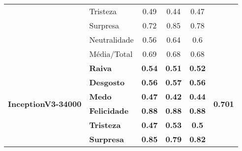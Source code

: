 \begin{table}[]
\begin{tabular}{llcccc}
                                            & Tristeza              & 0.49                                  & 0.44                                   & 0.47                                  &                                       \\
                                            & Surpresa              & 0.72                                  & 0.85                                   & 0.78                                  &                                       \\
                                            & Neutralidade          & 0.56                                  & 0.64                                   & 0.6                                   &                                       \\
                                            & Média/Total           & 0.69                                  & 0.68                                   & 0.68                                  &                                       \\ \hline
\multirow{8}{*}{\textbf{InceptionV3-34000}} & \textbf{Raiva}        & \textbf{0.54}                         & \textbf{0.51}                          & \textbf{0.52}                         & \multirow{8}{*}{\textbf{0.701}}       \\
                                            & \textbf{Desgosto}     & \textbf{0.56}                         & \textbf{0.57}                          & \textbf{0.56}                         &                                       \\
                                            & \textbf{Medo}         & \textbf{0.47}                         & \textbf{0.42}                          & \textbf{0.44}                         &                                       \\
                                            & \textbf{Felicidade}   & \textbf{0.88}                         & \textbf{0.88}                          & \textbf{0.88}                         &                                       \\
                                            & \textbf{Tristeza}     & \textbf{0.47}                         & \textbf{0.53}                          & \textbf{0.5}                          &                                       \\
                                            & \textbf{Surpresa}     & \textbf{0.85}                         & \textbf{0.79}                          & \textbf{0.82}                         &                                       \\

\end{tabular}
\end{table}

